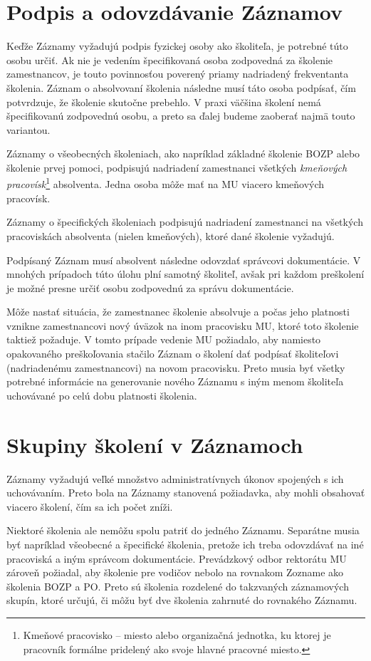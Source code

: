 \documentclass[
  digital,     %
  oneside,     %
  nosansbold,  %
  nocolorbold, %
  lof,         %
  nolot,         %
]{fithesis4}
\begin{document}
\section{Podpis a odovzdávanie Záznamov}
Keďže Záznamy vyžadujú podpis fyzickej osoby ako školiteľa, je potrebné túto osobu určiť. Ak nie je vedením špecifikovaná osoba zodpovedná za školenie zamestnancov, je touto povinnosťou poverený priamy nadriadený frekventanta školenia. Záznam o absolvovaní školenia následne musí táto osoba podpísať, čím potvrdzuje, že školenie skutočne prebehlo. V praxi väčšina školení nemá špecifikovanú zodpovednú osobu, a preto sa ďalej budeme zaoberať najmä touto variantou.

Záznamy o všeobecných školeniach, ako napríklad základné školenie BOZP alebo školenie prvej pomoci, podpisujú nadriadení zamestnanci všetkých \textit{kmeňových pracovísk}\footnote{Kmeňové pracovisko -- miesto alebo organizačná jednotka, ku ktorej je pracovník formálne pridelený ako svoje hlavné pracovné miesto.} absolventa. Jedna osoba môže mať na MU viacero kmeňových pracovísk.

Záznamy o špecifických školeniach podpisujú nadriadení zamestnanci na všetkých pracoviskách absolventa (nielen kmeňových), ktoré dané školenie vyžadujú.

Podpísaný Záznam musí absolvent následne odovzdať správcovi dokumentácie. V mnohých prípadoch túto úlohu plní samotný školiteľ, avšak pri každom preškolení je možné presne určiť osobu zodpovednú za správu dokumentácie.

Môže nastať situácia, že zamestnanec školenie absolvuje a počas jeho platnosti vznikne zamestnancovi nový úväzok na inom pracovisku MU, ktoré toto školenie taktiež požaduje. V tomto prípade vedenie MU požiadalo, aby namiesto opakovaného preškoľovania stačilo Záznam o školení dať podpísať školiteľovi (nadriadenému zamestnancovi) na novom pracovisku. Preto musia byť všetky potrebné informácie na generovanie nového Záznamu s iným menom školiteľa uchovávané po celú dobu platnosti školenia.

\section{Skupiny školení v Záznamoch}
Záznamy vyžadujú veľké množstvo administratívnych úkonov spojených s ich uchovávaním. Preto bola na Záznamy stanovená požiadavka, aby mohli obsahovať viacero školení, čím sa ich počet zníži.

Niektoré školenia ale nemôžu spolu patriť do jedného Záznamu. Separátne musia byť napríklad všeobecné a špecifické školenia, pretože ich treba odovzdávať na iné pracoviská a iným správcom dokumentácie. Prevádzkový odbor rektorátu MU zároveň požiadal, aby školenie pre vodičov nebolo na rovnakom Zozname ako školenia BOZP a PO. Preto sú školenia rozdelené do takzvaných záznamových skupín, ktoré určujú, či môžu byť dve školenia zahrnuté do rovnakého Záznamu.
\end{document}
